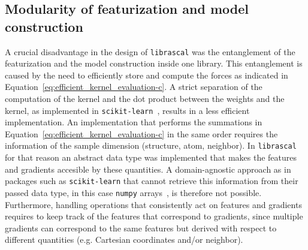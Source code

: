 \subsection{Modularity of featurization and model construction}
A crucial disadvantage in the design of \texttt{librascal} was the entanglement of the featurization and the model construction inside one library.
This entanglement is caused by the need to efficiently store and compute the forces as indicated in Equation~\eqref{eq:efficient_kernel_evaluation-c}.
A strict separation of the computation of the kernel and the dot product between the weights and the kernel, as implemented in \texttt{scikit-learn}~\cite{scikit-learn}, results in a less efficient implementation. 
An implementation that performs the summations in Equation~\eqref{eq:efficient_kernel_evaluation-c} in the same order requires the information of the sample dimension (structure, atom, neighbor).
In \texttt{librascal} for that reason an abstract data type was implemented that makes the features and gradients accesible by these quantities.
A domain-agnostic approach as in packages such as \texttt{scikit-learn} that cannot retrieve this information from their passed data type, in this case \texttt{numpy} arrays~\cite{harris2020array}, is therefore not possible.
Furthermore, handling operations that consistently act on features and gradients requires to keep track of the features that correspond to gradients, since multiple gradients can correspond to the same features but derived with respect to different quantities (e.g. Cartesian coordinates and/or neighbor).
